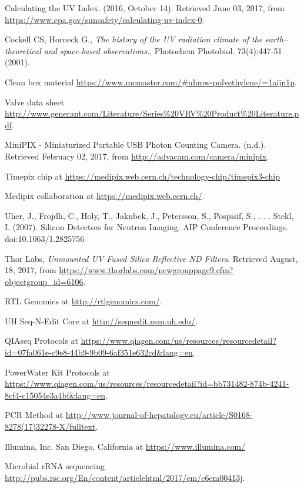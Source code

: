 \begin{thebibliography}{9}
  Calculating the UV Index. (2016, October 14). Retrieved June 03, 2017, from \url{https://www.epa.gov/sunsafety/calculating-uv-index-0}.

  Cockell CS, Horneck G., \textit{The history of the UV radiation climate of the earth--theoretical and space-based observations.}, Photochem Photobiol. 73(4):447-51 (2001).

Clean box material \url{https://www.mcmaster.com/\#uhmw-polyethylene/=1aijn1p}.

Valve data sheet \url{http://www.generant.com/Literature/Series\%20VRV\%20Product\%20Literature.pdf}.

  MiniPIX - Miniaturized Portable USB Photon Counting Camera. (n.d.). Retrieved February 02, 2017, from \url{http://advacam.com/camera/minipix}.

  Timepix chip at \url{https://medipix.web.cern.ch/technology-chip/timepix3-chip}

  Medipix collaboration at \url{https://medipix.web.cern.ch/}.

  Uher, J., Frojdh, C., Holy, T., Jakubek, J., Petersson, S., Pospisif, S., . . . Stekl, I. (2007). Silicon Detectors for Neutron Imaging. AIP Conference Proceedings. doi:10.1063/1.2825756

  Thor Labs, \textit{Unmounted UV Fused Silica Reflective ND Filters}. Retrieved August, 18, 2017, from \url{https://www.thorlabs.com/newgrouppage9.cfm?objectgroup_id=6106}.

  RTL Genomics at \url{http://rtlgenomics.com/}.
  
UH Seq-N-Edit Core at \url{http://seqnedit.nsm.uh.edu/}.
  
QIAseq Protocols at \url{https://www.qiagen.com/us/resources/resourcedetail?id=07fa061e-c9e8-44b9-9b09-6af351e632cd&lang=en}.  

PowerWater Kit Protocols at \url{https://www.qiagen.com/us/resources/resourcedetail?id=bb731482-874b-4241-8cf4-c15054e3a4bf&lang=en}.  


PCR Method at \url{http://www.journal-of-hepatology.eu/article/S0168-8278(17)32278-X/fulltext}.
	
	Illumina, Inc. San Diego, California at \url{https://www.illumina.com/}

Microbial rRNA sequencing \url{http://pubs.rsc.org/En/content/articlehtml/2017/em/c6em00413j}.
  

\end{thebibliography}
